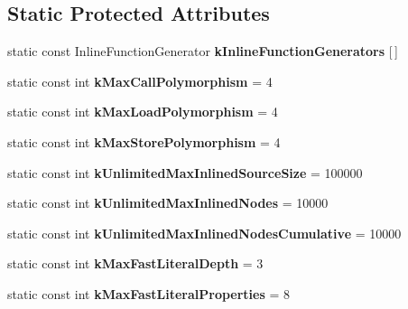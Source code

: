 \subsection*{Static Protected Attributes}
\begin{DoxyCompactItemize}
\item 
static const Inline\+Function\+Generator {\bfseries k\+Inline\+Function\+Generators} \mbox{[}$\,$\mbox{]}
\item 
\hypertarget{classv8_1_1internal_1_1_h_optimized_graph_builder_a3712b01f930e17c9602736ba6a3fb92d}{}static const int {\bfseries k\+Max\+Call\+Polymorphism} = 4\label{classv8_1_1internal_1_1_h_optimized_graph_builder_a3712b01f930e17c9602736ba6a3fb92d}

\item 
\hypertarget{classv8_1_1internal_1_1_h_optimized_graph_builder_a5bf6385044d3a666aa37a7d1f3f9ed23}{}static const int {\bfseries k\+Max\+Load\+Polymorphism} = 4\label{classv8_1_1internal_1_1_h_optimized_graph_builder_a5bf6385044d3a666aa37a7d1f3f9ed23}

\item 
\hypertarget{classv8_1_1internal_1_1_h_optimized_graph_builder_a0f3561465592972e1f9bc03385675130}{}static const int {\bfseries k\+Max\+Store\+Polymorphism} = 4\label{classv8_1_1internal_1_1_h_optimized_graph_builder_a0f3561465592972e1f9bc03385675130}

\item 
\hypertarget{classv8_1_1internal_1_1_h_optimized_graph_builder_adeea843015bf89f5ed482d67fdfab410}{}static const int {\bfseries k\+Unlimited\+Max\+Inlined\+Source\+Size} = 100000\label{classv8_1_1internal_1_1_h_optimized_graph_builder_adeea843015bf89f5ed482d67fdfab410}

\item 
\hypertarget{classv8_1_1internal_1_1_h_optimized_graph_builder_a0d3ca7dd0450c227acbc02baf590780f}{}static const int {\bfseries k\+Unlimited\+Max\+Inlined\+Nodes} = 10000\label{classv8_1_1internal_1_1_h_optimized_graph_builder_a0d3ca7dd0450c227acbc02baf590780f}

\item 
\hypertarget{classv8_1_1internal_1_1_h_optimized_graph_builder_a76c96c836bf49c16b402f1df29a26f6b}{}static const int {\bfseries k\+Unlimited\+Max\+Inlined\+Nodes\+Cumulative} = 10000\label{classv8_1_1internal_1_1_h_optimized_graph_builder_a76c96c836bf49c16b402f1df29a26f6b}

\item 
\hypertarget{classv8_1_1internal_1_1_h_optimized_graph_builder_aebc314e5ae3c8a3c3e85ff1814ae2128}{}static const int {\bfseries k\+Max\+Fast\+Literal\+Depth} = 3\label{classv8_1_1internal_1_1_h_optimized_graph_builder_aebc314e5ae3c8a3c3e85ff1814ae2128}

\item 
\hypertarget{classv8_1_1internal_1_1_h_optimized_graph_builder_a7d51fbacedd0cefb0f48ee14b02fa274}{}static const int {\bfseries k\+Max\+Fast\+Literal\+Properties} = 8\label{classv8_1_1internal_1_1_h_optimized_graph_builder_a7d51fbacedd0cefb0f48ee14b02fa274}

\end{DoxyCompactItemize}
